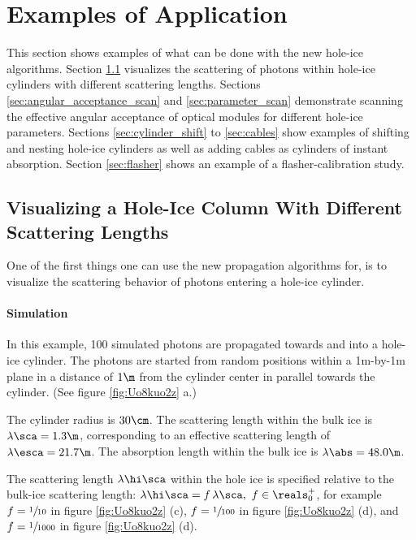 
\section{Examples of Application}
\label{sec:applications}

This section shows examples of what can be done with the new hole-ice algorithms. Section \ref{sec:scattering_simulation} visualizes the scattering of photons within hole-ice cylinders with different scattering lengths. Sections \ref{sec:angular_acceptance_scan} and \ref{sec:parameter_scan} demonstrate scanning the effective angular acceptance of optical modules for different hole-ice parameters. Sections \ref{sec:cylinder_shift} to \ref{sec:cables} show examples of shifting and nesting hole-ice cylinders as well as adding cables as cylinders of instant absorption. Section \ref{sec:flasher} shows an example of a flasher-calibration study.


\subsection{Visualizing a Hole-Ice Column With Different Scattering Lengths}
\label{sec:scattering_simulation}

One of the first things one can use the new propagation algorithms for, is to visualize the scattering behavior of photons entering a hole-ice cylinder.

\paragraph{Simulation}
In this example, 100 simulated photons are propagated towards and into a hole-ice cylinder. The photons are started from random positions within a 1m-by-1m plane in a distance of $1\m$ from the cylinder center in parallel towards the cylinder. (See figure \ref{fig:Uo8kuo2z} a.)

The cylinder radius is $30\cm$. The scattering length within the bulk ice is $\lambda\sca = 1.3\m$, corresponding to an effective scattering length of $\lambda\esca = 21.7\m$. The absorption length within the bulk ice is $\lambda\abs = 48.0\m$.

The scattering length $\lambda\hi\sca$ within the hole ice is specified relative to the bulk-ice scattering length: $\lambda\hi\sca = f\,\lambda\sca, \ f \in \reals_0^+$, for example $f = \sfrac{1}{10}$ in figure \ref{fig:Uo8kuo2z} (c), $f = \sfrac{1}{100}$ in figure \ref{fig:Uo8kuo2z} (d), and $f = \sfrac{1}{1000}$ in figure \ref{fig:Uo8kuo2z} (d).

